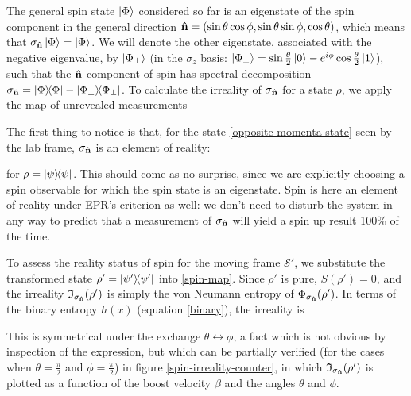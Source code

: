 \documentclass[12pt,a4paper,notitlepage]{report}
\begin{document}
The general spin state $\ket{\Phi}$ considered so far is an eigenstate of the spin component in the general direction $\vu{n} = (\sin\theta\cos\phi, \sin\theta\sin\phi, \cos\theta)$, which means that $\sigma_{\vu{n}} \ket{\Phi} = \ket{\Phi}$. We will denote the other eigenstate, associated with the negative eigenvalue, by $\ket{\Phi_\bot}$ (in the $\sigma_z$ basis: $\ket{\Phi_\bot} = \sin\frac{\theta}{2}\ket{0} - e^{i\phi}\cos\frac{\theta}{2}\ket{1}$), such that the $\vu{n}$-component of spin has spectral decomposition $\sigma_{\vu{n}} = \dyad{\Phi} - \dyad{\Phi_\bot}$. To calculate the irreality of $\sigma_{\vu{n}}$ for a state $\rho$, we apply the map of unrevealed measurements

%

The first thing to notice is that, for the state \eqref{opposite-momenta-state} seen by the lab frame, $\sigma_{\vu{n}}$ is an element of reality:

%
for $\rho = \dyad{\psi}$. This should come as no surprise, since we are explicitly choosing a spin observable for which the spin state is an eigenstate. Spin is here an element of reality under EPR's criterion as well: we don't need to disturb the system in any way to predict that a measurement of $\sigma_{\vu{n}}$ will yield a spin up result 100\% of the time.

To assess the reality status of spin for the moving frame $\mathcal{S}'$, we substitute the transformed state $\rho' = \dyad{\psi'}$ into \eqref{spin-map}. Since $\rho'$ is pure, $S(\rho') = 0$, and the irreality $\mathfrak{I}_{\sigma_{\vu{n}}}(\rho')$ is simply the von Neumann entropy of  $\Phi_{\sigma_{\vu{n}}}(\rho')$. In terms of the binary entropy $h(x)$ (equation \eqref{binary}), the irreality is

%
This is symmetrical under the exchange $\theta \leftrightarrow \phi$, a fact which is not obvious by inspection of the expression, but which can be partially verified (for the cases when $\theta = \frac{\pi}{2}$ and $\phi = \frac{\pi}{2}$) in figure \ref{spin-irreality-counter}, in which $\mathfrak{I}_{\sigma_{\vu{n}}}(\rho')$ is plotted as a function of the boost velocity $\beta$ and the angles $\theta$ and $\phi$.
\end{document}
